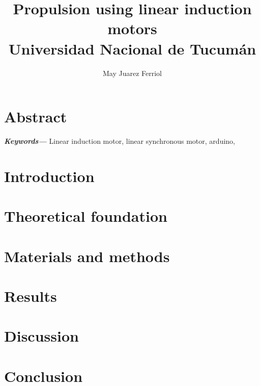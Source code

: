 \documentclass[a4paper,12pt]{article}
\title{Propulsion using linear induction motors\\ 
\medskip \large Universidad Nacional de Tucumán}
\author{May Juarez Ferriol}
\date{}
\providecommand{\keywords}[1] %
{
    \small	
    \textbf{\textit{Keywords---}} #1
}
\begin{document}
\maketitle

\section*{Abstract}

    

\keywords{Linear induction motor, linear synchronous motor, arduino, }

\medskip

\begin{multicols*}{2}

\section*{Introduction}

    

\section*{Theoretical foundation}

    

\section*{Materials and methods}

    

\section*{Results}

    

\section*{Discussion}

    

\section*{Conclusion}

    


    


\end{multicols*}
\end{document}
